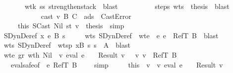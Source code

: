 \begin{isabellebody}
\ \ \ \ \ \ \ \ \ \ \isamarkupfalse \ wt{\isacharunderscore}k\ ss\ strengthen{\isacharunderscore}stack\ \isamarkupfalse \ blast\ \isamarkupfalse \isanewline
\ \ \ \ \ \ \ \ \isamarkupfalse \ steps\ wt{\isacharunderscore}s\ \isamarkupfalse \ {\isacharquery}thesis\ \isamarkupfalse \ blast\isanewline
\ \ \ \ \ \ \isamarkupfalse \isanewline
\ \ \ \ \ \ \ \ \isamarkupfalse \ {\isachardoublequoteopen}cast\ v\ B\ C\ {\isasymmu}\ ads\ {\isacharequal}\ CastError{\isachardoublequoteclose}\isanewline
\ \ \ \ \ \ \ \ \isamarkupfalse \ this\ SCast\ Nil\ st\ v\ \isamarkupfalse \ {\isacharquery}thesis\ \isamarkupfalse \ simp\isanewline
\ \ \ \ \ \ \isamarkupfalse \isanewline
\ \ \isamarkupfalse \isanewline
\ \ \ \ \isamarkupfalse \ {\isacharparenleft}SDynDeref\ x\ e\ B\ s{\isacharprime}{\isacharparenright}\isanewline
\ \ \ \ \isamarkupfalse \ wts\ SDynDeref\ \isamarkupfalse \ wte{\isacharcolon}\ {\isachardoublequoteopen}{\isasymGamma}\ {\isasymturnstile}\isactrlisub e\ e\ {\isacharcolon}\ RefT\ B{\isachardoublequoteclose}\ \isamarkupfalse \ blast\isanewline
\ \ \ \ \isamarkupfalse \ wts\ SDynDeref\ \isamarkupfalse \ wtsp{\isacharcolon}\ {\isachardoublequoteopen}{\isacharparenleft}x{\isacharcomma}B{\isacharparenright}{\isacharhash}{\isasymGamma}\ {\isasymturnstile}\isactrlisub s\ s{\isacharprime}\ {\isacharcolon}\ A{\isacharprime}{\isachardoublequoteclose}\ \isamarkupfalse \ blast\isanewline
\ \ \ \ \isamarkupfalse \ wte\ gr\ wt{\isacharunderscore}h\ Nil\ \isamarkupfalse \ {\isachardoublequoteopen}{\isacharparenleft}{\isasymexists}v{\isachardot}\ eval\ e\ {\isasymrho}\ {\isasymmu}\ {\isacharequal}\ Result\ v\ {\isasymand}\ {\isasymSigma}\ {\isasymturnstile}v\ v\ {\isacharcolon}\ RefT\ B{\isacharparenright}{\isachardoublequoteclose}\isanewline
\ \ \ \ \ \ \isamarkupfalse \ eval{\isacharunderscore}safe{\isacharbrackleft}of\ {\isasymGamma}\ e\ {\isachardoublequoteopen}RefT\ B{\isachardoublequoteclose}\ {\isasymSigma}\ {\isasymrho}\ {\isasymmu}{\isacharbrackright}\ \isamarkupfalse \ simp\isanewline
\ \ \ \ \isamarkupfalse \ this\ \isamarkupfalse \ v\ \ v{\isacharcolon}\ {\isachardoublequoteopen}eval\ e\ {\isasymrho}\ {\isasymmu}\ {\isacharequal}\ Result\ v{\isachardoublequoteclose}\isanewline

\end{isabellebody}
